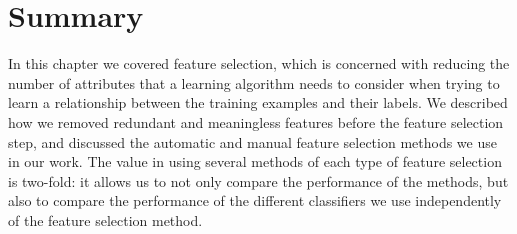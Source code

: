 \section{Summary}
In this chapter we covered feature selection, which is concerned with reducing
the number of attributes that a learning algorithm needs to consider when
trying to learn a relationship between the training examples and their labels.
We described how we removed redundant and meaningless features before the
feature selection step, and discussed the automatic and manual feature
selection methods we use in our work. The value in using several methods of
each type of feature selection is two-fold: it allows us to not only compare
the performance of the methods, but also to compare the performance of the
different classifiers we use independently of the feature selection method.
